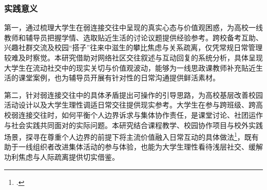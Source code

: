 \subsubsection{实践意义}

第一，通过梳理大学生在弱连接交往中呈现的真实心态与价值观困惑，为高校一线教师和辅导员把握学情、选取贴近生活的讨论议题提供经验参考。跨校备考互助、兴趣社群交流及校园“搭子”往来中滋生的攀比焦虑与关系疏离，仅凭常规日常管理较难及时察觉。本研究借助对网络社区交往叙述与互动回复的系统分析，具体呈现大学生在流动社交中的现实关切与价值观波动，能够为一线思政课教师补充贴近生活的课堂案例，也为辅导员开展有针对性的日常沟通提供鲜活素材。

第二，针对弱连接交往中的具体矛盾提出可操作的引导思路，为高校基层改善校园活动设计以及大学生理性调适日常交往提供现实参考。大学生在参与跨班级、跨高校弱连接交往时，如何平衡个人边界诉求与集体协作责任，是课堂讨论、社团运作与社会实践共同面对的实际问题。本研究结合课程教学、校园协作项目与校外实践场景，探寻在尊重个人边界的前提下将主流价值融入日常互动的具体做法\footcite{Shen2021_narrative}，既有助于一线组织者改进集体活动的参与体验，也能为大学生理性看待浅层社交、缓解功利焦虑与人际疏离提供切实借鉴。
